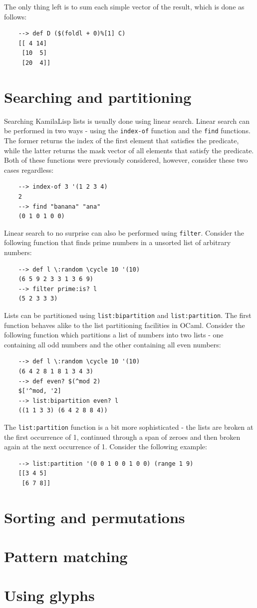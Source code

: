 The only thing left is to sum each simple vector of the result, which is done as follows:

\begin{Verbatim}
    --> def D ($(foldl + 0)%[1] C)
    [[ 4 14]
     [10  5]
     [20  4]]
\end{Verbatim}

\section{Searching and partitioning}

Searching KamilaLisp lists is usually done using linear search. Linear search can be performed in two ways - using the \verb|index-of| function and the \verb|find| functions. The former returns the index of the first element that satisfies the predicate, while the latter returns the mask vector of all elements that satisfy the predicate. Both of these functions were previously considered, however, consider these two cases regardless:

\begin{Verbatim}
    --> index-of 3 '(1 2 3 4)
    2
    --> find "banana" "ana"
    (0 1 0 1 0 0)
\end{Verbatim}

Linear search to no surprise can also be performed using \verb|filter|. Consider the following function that finds prime numbers in a unsorted list of arbitrary numbers:

\begin{Verbatim}
    --> def l \:random \cycle 10 '(10)
    (6 5 9 2 3 3 1 3 6 9)
    --> filter prime:is? l
    (5 2 3 3 3)
\end{Verbatim}

Lists can be partitioned using \verb|list:bipartition| and \verb|list:partition|. The first function behaves alike to the list partitioning facilities in OCaml. Consider the following function which partitions a list of numbers into two lists - one containing all odd numbers and the other containing all even numbers:

\begin{Verbatim}
    --> def l \:random \cycle 10 '(10)
    (6 4 2 8 1 8 1 3 4 3)
    --> def even? $(^mod 2)
    $['^mod, '2]
    --> list:bipartition even? l
    ((1 1 3 3) (6 4 2 8 8 4))
\end{Verbatim}

The \verb|list:partition| function is a bit more sophisticated - the lists are broken at the first occurrence of 1, continued through a span of zeroes and then broken again at the next occurrence of 1. Consider the following example:

\begin{Verbatim}
    --> list:partition '(0 0 1 0 0 1 0 0) (range 1 9)
    [[3 4 5]
     [6 7 8]]
\end{Verbatim}

\section{Sorting and permutations}

\section{Pattern matching}

\section{Using glyphs}
